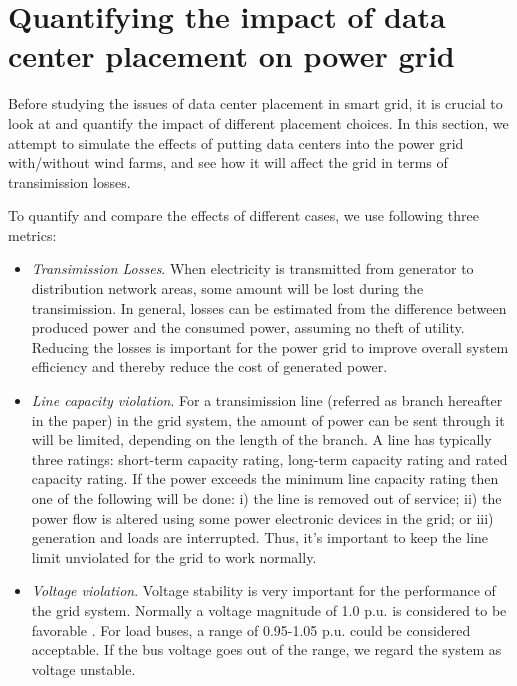 \section{Quantifying the impact of data center placement on power grid}
\label{sec:quantify}

Before studying the issues of data center placement in smart grid, it is crucial to look at and quantify the impact of different placement choices. In this section, we attempt to simulate the effects of putting data centers into the power grid with/without wind farms, and see how it will affect the grid in terms of transimission losses.

To quantify and compare the effects of different cases, we use following three metrics:

\begin{itemize}

\item \emph{Transimission Losses}.  When electricity is transmitted from generator to distribution network areas, some amount will be lost during the transimission. In general, losses can be estimated from the difference between produced power and the consumed power, assuming no theft of utility. Reducing the losses is important for the power grid to improve overall system efficiency and thereby reduce the cost of generated power.

\item \emph{Line capacity violation}. For a transimission line (referred as branch hereafter in the paper) in the grid system, the amount of power can be sent through it will be limited, depending on the length of the branch. A line has typically three ratings: short-term capacity rating, long-term capacity rating and rated capacity rating. If the power exceeds the minimum line capacity rating then one of the following will be done: i) the line is removed out of service; ii) the power flow is altered using some power electronic devices in the grid; or iii) generation and loads are interrupted. Thus, it's important to keep the line limit unviolated for the grid to work normally.

\item \emph{Voltage violation}. Voltage stability is very important for the performance of the grid system. Normally a voltage magnitude of 1.0 p.u. is considered to be favorable \cite{Seifi11}. For load buses, a range of 0.95-1.05 p.u. could be considered acceptable. If the bus voltage goes out of the range, we regard the system as voltage unstable. 

\end{itemize}

